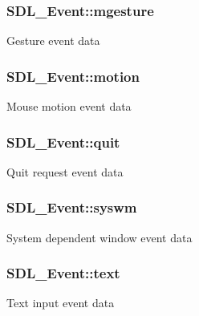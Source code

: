 \subsubsection[{mgesture}]{ S\+D\+L\+\_\+\+Event\+::mgesture}\label{unionSDL__Event_ac19b3c6a6b5181a51eb4fbe2cbe726a9}
Gesture event data \hypertarget{unionSDL__Event_ac3c89e190faacbe84280cd539453bab6}{}
\subsubsection[{motion}]{ S\+D\+L\+\_\+\+Event\+::motion}\label{unionSDL__Event_ac3c89e190faacbe84280cd539453bab6}
Mouse motion event data \hypertarget{unionSDL__Event_a102a3008afe67a1c02ae7504e232dcef}{}
\subsubsection[{quit}]{ S\+D\+L\+\_\+\+Event\+::quit}\label{unionSDL__Event_a102a3008afe67a1c02ae7504e232dcef}
Quit request event data \hypertarget{unionSDL__Event_ab3b2eaf5348d4c50a51b1f297fdef537}{}
\subsubsection[{syswm}]{ S\+D\+L\+\_\+\+Event\+::syswm}\label{unionSDL__Event_ab3b2eaf5348d4c50a51b1f297fdef537}
System dependent window event data \hypertarget{unionSDL__Event_aa4fc65c559d69f33c057c0c23d8414b8}{}
\subsubsection[{text}]{ S\+D\+L\+\_\+\+Event\+::text}\label{unionSDL__Event_aa4fc65c559d69f33c057c0c23d8414b8}
Text input event data \hypertarget{unionSDL__Event_ab18d7d60794cb056948ffa58541bc3c5}{}

